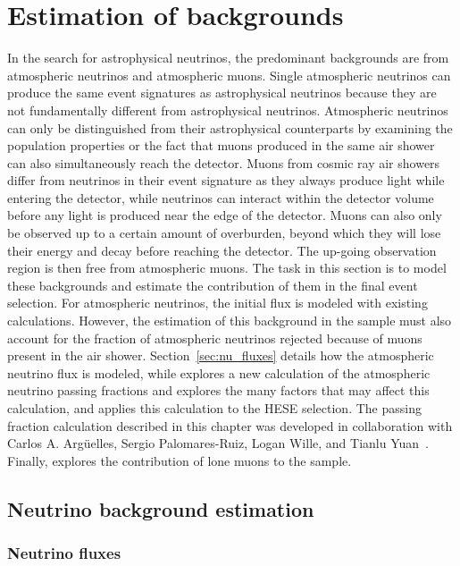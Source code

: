 \chapter{Estimation of backgrounds}\label{chapter:backgrounds}\label{sec:background_estimation}

In the search for astrophysical neutrinos, the predominant backgrounds are from atmospheric neutrinos and atmospheric muons.
Single atmospheric neutrinos can produce the same event signatures as astrophysical neutrinos because they are not fundamentally different from astrophysical neutrinos.
Atmospheric neutrinos can only be distinguished from their astrophysical counterparts by examining the population properties or the fact that muons produced in the same air shower can also simultaneously reach the detector.
Muons from cosmic ray air showers differ from neutrinos in their event signature as they always produce light while entering the detector, while neutrinos can interact within the detector volume before any light is produced near the edge of the detector.
Muons can also only be observed up to a certain amount of overburden, beyond which they will lose their energy and decay before reaching the detector.
The up-going observation region is then free from atmospheric muons.
The task in this section is to model these backgrounds and estimate the contribution of them in the final event selection.
For atmospheric neutrinos, the initial flux is modeled with existing calculations.
However, the estimation of this background in the sample must also account for the fraction of atmospheric neutrinos rejected because of muons present in the air shower.
Section~\ref{sec:nu_fluxes} details how the atmospheric neutrino flux is modeled, while  explores a new calculation of the atmospheric neutrino passing fractions and explores the many factors that may affect this calculation, and  applies this calculation to the HESE selection.
The passing fraction calculation described in this chapter was developed in collaboration with Carlos A. Argüelles, Sergio Palomares-Ruiz, Logan Wille, and Tianlu Yuan~\cite{Arguelles:2018awr}.
Finally,  explores the contribution of lone muons to the sample.

\section{Neutrino background estimation}
\subsection{Neutrino fluxes\label{sec:nu_fluxes}}

